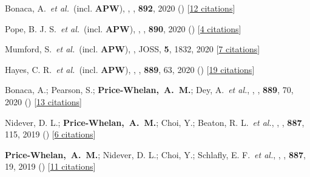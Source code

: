 \item[{\color{deemph}\scriptsize63}]Bonaca, A.~\textit{et al.}~(incl. \textbf{APW}), , \apj, \textbf{892}, 2020 () [\href{http://adsabs.harvard.edu/abs/2020ApJ...892L..37B}{12 citations}]

\item[{\color{deemph}\scriptsize62}]Pope, B. J. S.~\textit{et al.}~(incl. \textbf{APW}), , \apj, \textbf{890}, 2020 () [\href{http://adsabs.harvard.edu/abs/2020ApJ...890L..19P}{4 citations}]

\item[{\color{deemph}\scriptsize61}]Mumford, S.~\textit{et al.}~(incl. \textbf{APW}), , JOSS, \textbf{5}, 1832, 2020 [\href{http://adsabs.harvard.edu/abs/2020JOSS....5.1832M}{7 citations}]

\item[{\color{deemph}\scriptsize60}]Hayes, C. R.~\textit{et al.}~(incl. \textbf{APW}), , \apj, \textbf{889}, 63, 2020 () [\href{http://adsabs.harvard.edu/abs/2020ApJ...889...63H}{19 citations}]

\item[{\color{deemph}\scriptsize59}]Bonaca, A.; Pearson, S.; \textbf{Price-Whelan,~A.~M.}; Dey, A.~\textit{et al.}, , \apj, \textbf{889}, 70, 2020 () [\href{http://adsabs.harvard.edu/abs/2020ApJ...889...70B}{13 citations}]

\item[{\color{deemph}\scriptsize58}]Nidever, D. L.; \textbf{Price-Whelan,~A.~M.}; Choi, Y.; Beaton, R. L.~\textit{et al.}, , \apj, \textbf{887}, 115, 2019 () [\href{http://adsabs.harvard.edu/abs/2019ApJ...887..115N}{6 citations}]

\item[{\color{deemph}\scriptsize57}]\textbf{Price-Whelan,~A.~M.}; Nidever, D. L.; Choi, Y.; Schlafly, E. F.~\textit{et al.}, , \apj, \textbf{887}, 19, 2019 () [\href{http://adsabs.harvard.edu/abs/2019ApJ...887...19P}{11 citations}]

